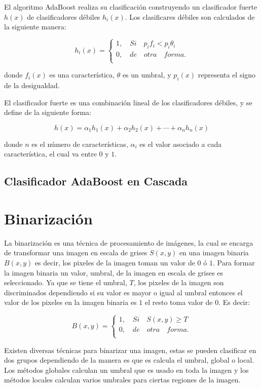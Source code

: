 El algoritmo AdaBoost realiza su clasificación construyendo un clasificador fuerte $h(x)$ de clasificadores débiles $h_i(x)$. Los clasificares débiles son calculados de la siguiente manera: 

$$h_i(x)=
\begin{cases}   
1, \quad Si \quad  p_if_i<p_i \theta_i \\
0, \quad de \quad otra \quad forma.\\
\end{cases}$$

donde $f_i(x)$ es una característica, $\theta$ es un umbral, y $p_i(x)$ representa el signo de la desigualdad.   

El clasificador fuerte es una combinación lineal de los clasificadores débiles, y se define de la siguiente forma: 

$$h(x)= \alpha_1h_1(x)+\alpha_2h_2(x)+ \cdots +\alpha_nh_n(x)$$ 

donde $n$ es el n\'umero de características, $\alpha_i$ es el valor asociado a cada característica, el cual va entre $0$ y $1$.


\subsection{Clasificador AdaBoost en Cascada}\label{subsec:AdaboostCascade}   


\section{Binarización}\label{Binarization} 

La binarización es una técnica de procesamiento de imágenes, la cual se encarga de transformar una imagen en escala de grises $S(x,y)$ en una imagen binaria $B(x,y)$ es decir, los pixeles de la imagen toman un valor de $0$ ó $1$.   
Para formar la imagen binaria un valor, umbral, de la imagen en escala de grises es seleccionado. Ya que se tiene el umbral, $T$,     
los pixeles de la imagen son discriminados dependiendo si su valor es mayor o igual al umbral entonces el valor de los pixeles en la imagen binaria es $1$ el resto toma valor de $0$. Es decir: 

$$B(x,y)=
\begin{cases}   
1, \quad Si \quad  S(x,y)\geq T \\
0, \quad de \quad otra \quad forma.\\
\end{cases}$$

Existen diversas técnicas para binarizar una imagen, estas se pueden clasificar en dos grupos dependiendo de la manera es que es calcula el umbral, global o local. Los métodos globales calculan un umbral que es usado en toda la imagen y los métodos locales calculan varios umbrales para ciertas regiones de la imagen.  

